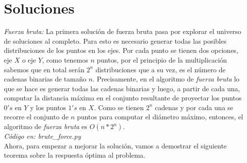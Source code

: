 \documentclass{article}
\begin{document}
\section{Soluciones}

\textit{Fuerza bruta:} La primera soluci\'on de fuerza bruta pasa por explorar el universo de soluciones al completo. Para esto es necesario generar todas las posibles distribuciones de los puntos en los ejes. Por cada punto se tienen dos opciones, eje $X$ o eje $Y$, como tenemos $n$ puntos, por el principio de la multiplicaci\'on sabemos que en total ser\'an $2^n$ distribuciones que a su vez, es el n\'umero de cadenas binarias de tama\~no $n$. Precisamente, en el algoritmo de \textit{fuerza bruta} lo que se hace es generar todas las cadenas binarias y luego, a partir de cada una, computar la distancia m\'axima en el conjunto resultante de proyectar los puntos $0's$ en $Y$ y los puntos $1's$ en $X$. Como se tienen $2^n$ cadenas y por cada una se recorre el conjunto de $n$ puntos para computar el di\'ametro m\'aximo, entonces, el algoritmo de \textit{fuerza bruta} es $O(n*2^n)$.\\
\textit{C\'odigo en: brute\_force.py}\\

Ahora, para empezar a mejorar la soluci\'on, vamos a demostrar el siguiente teorema sobre la respuesta \'optima al problema.\\
\end{document}
